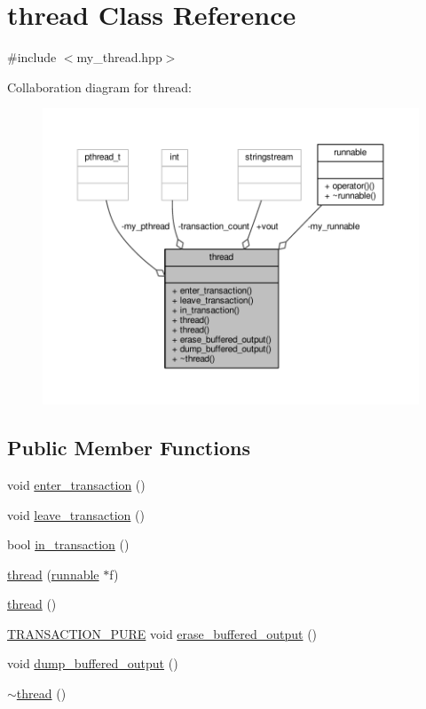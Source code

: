 \hypertarget{classthread}{\section{thread Class Reference}
\label{classthread}
}


{\ttfamily \#include $<$my\-\_\-thread.\-hpp$>$}



Collaboration diagram for thread\-:
\nopagebreak
\begin{figure}[H]
\begin{center}
\leavevmode
\includegraphics[width=350pt]{classthread__coll__graph}
\end{center}
\end{figure}
\subsection*{Public Member Functions}
\begin{DoxyCompactItemize}
\item 
void \hyperlink{classthread_a275b656d36e4f9f7a84e2ae3e6f42c10}{enter\-\_\-transaction} ()
\item 
void \hyperlink{classthread_a9c79b7165547b8f4c71e5798d3a1dcbb}{leave\-\_\-transaction} ()
\item 
bool \hyperlink{classthread_a9278ee63c0cb030fe1d0a9e94182eac6}{in\-\_\-transaction} ()
\item 
\hyperlink{classthread_ac6be14cb7697377971d2ca750430778a}{thread} (\hyperlink{classrunnable}{runnable} $\ast$f)
\item 
\hyperlink{classthread_a89227b1aa26caf81b01feb85c011e624}{thread} ()
\item 
\hyperlink{common_8hpp_aad0b6a771c65df7f474192857172ee3e}{T\-R\-A\-N\-S\-A\-C\-T\-I\-O\-N\-\_\-\-P\-U\-R\-E} void \hyperlink{classthread_ac78f7f3177a45bcca542c836476353ad}{erase\-\_\-buffered\-\_\-output} ()
\item 
void \hyperlink{classthread_a7fad6d0b13a7235fabaf4d7de023a409}{dump\-\_\-buffered\-\_\-output} ()
\item 
\hyperlink{classthread_a117e0892c1d1a90bece03424311676f6}{$\sim$thread} ()
\end{DoxyCompactItemize}
